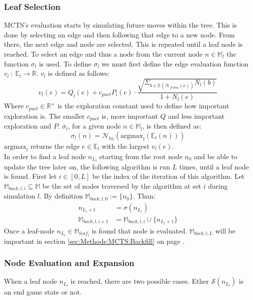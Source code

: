 \documentclass[12pt]{article}
\newcommand{\sectionref}[1]{section \ref{#1} on page \pageref{#1}}
\begin{document}
\subsubsection{Leaf Selection} \label{sec:Methods:MCTS:Leaf_selection}
MCTS's evaluation starts by simulating future moves within the tree. This is done by selecting an edge and then following that edge to a new node. From there, the next edge and node are selected. This is repeated until a leaf node is reached. To select an edge and thus a node from the current node \(n\in \mathbb{M}_l\) the function \(\sigma_l\) is used. To define \(\sigma_l\) we must first define the edge evaluation function \(v_l~:~\mathbb{E}_{l}\to\mathbb{R}\). \(v_l\) is defined as follows:
\begin{equation}
v_l(e) = Q_l(e) + c_{puct}P_l(e)\cdot\frac{\sqrt{\Sigma_{b\in\mathbb{E}(\mathcal{N}_{from_l}(e))}N_l(b)}}{1+N_l(e)}
\end{equation}
Where \(c_{puct}\in \mathbb{R}^+\) is the exploration constant used to define how important exploration is. The smaller \(c_{puct}\) is, more important \(Q\) and less important exploration and \(P\). \(\sigma_l\), for a given node \(n\in\mathbb{M}_l\), is then defined as:
\begin{equation}\label{eq:sigma}
\sigma_l(n) = \mathcal{N}_{to_l}(\text{argmax}_l(\mathbb{E}_l(n)))
\end{equation}
\(\text{argmax}_l\) returns the edge \(e \in\mathbb E_l\) with the largest \(v_l(e)\).\\
In order to find a leaf node \(n_{L_l}\) starting from the root node \(n_{0}\) and be able to update the tree later on, the following algorithm is run \(L\) times, until a leaf node is found. First let \(i \in [0,L]\) be the index of the iteration of this algorithm. Let \(\mathbb M_{back,l,i} \subseteq \mathbb M\) be the set of nodes traversed by the algorithm at set \(i\) during simulation \(l\). By definition \(\mathbb M_{back,l,0} := \{n_0\}\). Than:
\begin{align}
n_{L_i+1} &= \sigma (n_{L_i})\\
\mathbb M_{back,l,i+1} &= \mathbb M_{back,l,i} \cup \{n_{L_i+1}\}
\end{align}
Once a leaf-node \(n_{L_l}\in\mathbb{M}_{leaf_l}\) is found that node is evaluated. \(\mathbb M_{back,l,L}\) will be important in \sectionref{sec:Methods:MCTS:Backfill}.


\subsubsection{Node Evaluation and Expansion}
\label{sec:Methods:MCTS:Node Evaluation and Expansion}
When a leaf node \(n_{L_l}\) is reached, there are two possible cases. Ether \(\mathcal S(n_{L_l})\) is an end game state or not.
\end{document}
